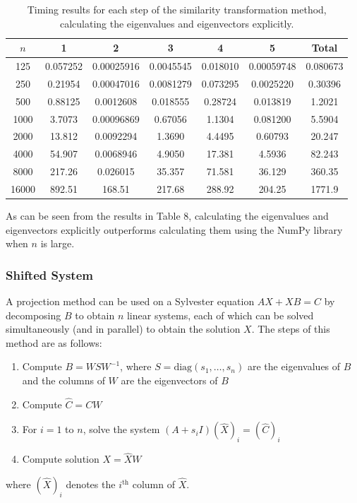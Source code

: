 \documentclass{article}
\numberwithin{equation}{section}
\begin{document}
\begin{table}[H]
\centering
\begin{tabular}{|c|c|c|c|c|c|c|}
\hline
$n$ & 1 & 2 & 3 & 4 & 5 & Total \\
\hline
125 & 0.057252 & 0.00025916 & 0.0045545 & 0.018010 & 0.00059748 & 0.080673 \\
250 & 0.21954 & 0.00047016 & 0.0081279 & 0.073295 & 0.0025220 & 0.30396 \\ 
500 & 0.88125 & 0.0012608 & 0.018555 & 0.28724 & 0.013819 & 1.2021  \\
1000 & 3.7073 & 0.00096869 & 0.67056 & 1.1304 & 0.081200 & 5.5904 \\
2000 & 13.812 & 0.0092294 & 1.3690 & 4.4495 & 0.60793 & 20.247 \\
4000 & 54.907 & 0.0068946 & 4.9050 & 17.381 & 4.5936 & 82.243 \\
8000 & 217.26 & 0.026015 & 35.357 & 71.581 & 36.129 & 360.35 \\
16000 & 892.51 & 168.51 & 217.68 & 288.92 & 204.25 & 1771.9 \\
\hline
\end{tabular}
\captionsetup{justification=centering}
\caption{Timing results for each step of the similarity transformation method, calculating the eigenvalues and eigenvectors explicitly.}
\end{table}

As can be seen from the results in Table 8, calculating the eigenvalues and eigenvectors explicitly  outperforms calculating them using the NumPy library when $n$ is large.

\subsubsection{Shifted System}
A projection method \cite{Simoncini} can be used on a Sylvester equation $AX + XB =C$ by decomposing $B$ to obtain $n$ linear systems, each of which can be solved simultaneously (and in parallel) to obtain the solution $X$. The steps of this method are as follows:
\begin{enumerate}
\item Compute $B = WSW^{-1}$, where $S = \text{diag}(s_1, \dots, s_n)$ are the eigenvalues of $B$ and the columns of $W$ are the eigenvectors of $B$
\item Compute $\hat{C} = CW$
\item For $i=1$ to $n$, solve the system $(A+s_i I)(\hat{X})_i = (\hat{C})_i$
\item Compute solution $X = \hat{X}W$
\end{enumerate}
where $(\hat{X})_i$ denotes the $i^{\text{th}}$ column of $\hat{X}$.
\end{document}
